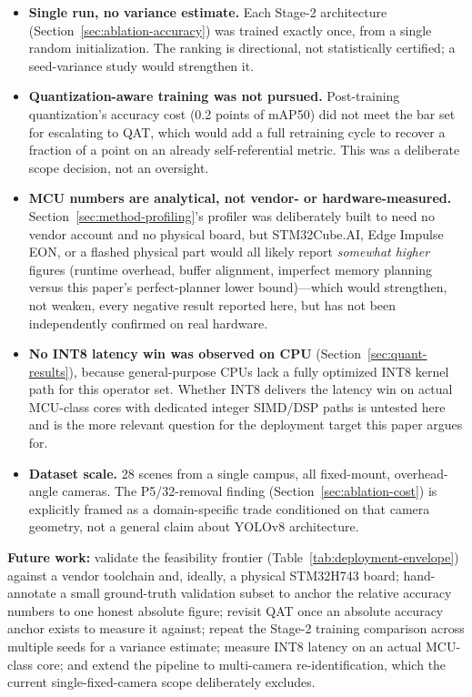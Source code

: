 \documentclass[11pt]{article}
\begin{document}
\begin{itemize}[leftmargin=1.4em, itemsep=0.2em]
  \item \textbf{Single run, no variance estimate.} Each Stage-2 architecture
  (Section~\ref{sec:ablation-accuracy}) was trained exactly once, from a
  single random initialization. The ranking is directional, not
  statistically certified; a seed-variance study would strengthen it.
  \item \textbf{Quantization-aware training was not pursued.} Post-training
  quantization's accuracy cost (0.2 points of mAP50) did not meet the bar
  set for escalating to QAT, which would add a full retraining cycle to
  recover a fraction of a point on an already self-referential metric. This
  was a deliberate scope decision, not an oversight.
  \item \textbf{MCU numbers are analytical, not vendor- or hardware-measured.}
  Section~\ref{sec:method-profiling}'s profiler was deliberately built to
  need no vendor account and no physical board, but STM32Cube.AI, Edge
  Impulse EON, or a flashed physical part would all likely report
  \emph{somewhat higher} figures (runtime overhead, buffer alignment,
  imperfect memory planning versus this paper's perfect-planner lower
  bound)---which would strengthen, not weaken, every negative result
  reported here, but has not been independently confirmed on real hardware.
  \item \textbf{No INT8 latency win was observed on CPU}
  (Section~\ref{sec:quant-results}), because general-purpose CPUs lack a
  fully optimized INT8 kernel path for this operator set. Whether INT8
  delivers the latency win on actual MCU-class cores with dedicated integer
  SIMD/DSP paths is untested here and is the more relevant question for the
  deployment target this paper argues for.
  \item \textbf{Dataset scale.} 28 scenes from a single campus, all
  fixed-mount, overhead-angle cameras. The P5/32-removal finding
  (Section~\ref{sec:ablation-cost}) is explicitly framed as a domain-specific
  trade conditioned on that camera geometry, not a general claim about
  YOLOv8 architecture.
\end{itemize}

\textbf{Future work:} validate the feasibility frontier
(Table~\ref{tab:deployment-envelope}) against a vendor toolchain and, ideally,
a physical STM32H743 board; hand-annotate a small ground-truth validation
subset to anchor the relative accuracy numbers to one honest absolute
figure; revisit QAT once an absolute accuracy anchor exists to measure it
against; repeat the Stage-2 training comparison across multiple seeds for a
variance estimate; measure INT8 latency on an actual MCU-class core; and
extend the pipeline to multi-camera re-identification, which the current
single-fixed-camera scope deliberately excludes.
\end{document}
